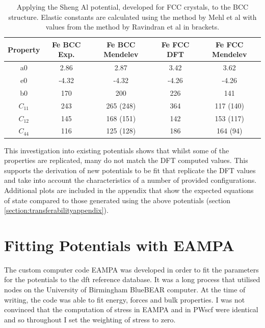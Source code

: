 \begin{table}[h]
\begin{center}
\begin{tabular}{c c c c c}
\hline\hline
Property   & Fe BCC Exp. & Fe BCC Mendelev &  Fe FCC DFT & Fe FCC Mendelev \\
\hline\hline
a0             &   2.86  &   2.87      &   3.42   &   3.62          \\
e0             &  -4.32  &  -4.32      &  -4.26   &  -4.26          \\
b0             &   170  &    200       &  226     &   141            \\
$C_{11}$       &   243  &   265 (248)  &  364     &   117 (140)        \\
$C_{12}$       &   145  &   168 (151)  &  142     &   153 (117)      \\
$C_{44}$       &   116  &   125 (128)  &  186     &   164 (94)       \\
\hline\hline
\end{tabular}
\end{center}
\caption{Applying the Sheng Al potential, developed for FCC crystals, to the BCC structure.  Elastic constants are calculated using the method by Mehl et al with values from the method by Ravindran et al in brackets.}
\label{table:feacklandtransferability}
\end{table}

This investigation into existing potentials shows that whilst some of the properties are replicated, many do not match the DFT computed values.  This supports the derivation of new potentials to be fit that replicate the DFT values and take into account the characteristics of a number of provided configurations.  Additional plots are included in the appendix that show the expected equations of state compared to those generated using the above potentials (section \ref{section:transferabilityappendix}).




\section{Fitting Potentials with EAMPA}

The custom computer code EAMPA was developed in order to fit the parameters for the potentials to the \acrshort{dft} reference database.  It was a long process that utilised nodes on the University of Birmingham BlueBEAR computer.  At the time of writing, the code was able to fit energy, forces and bulk properties.  I was not convinced that the computation of stress in EAMPA and in PWscf were identical and so throughout I set the weighting of stress to zero.

